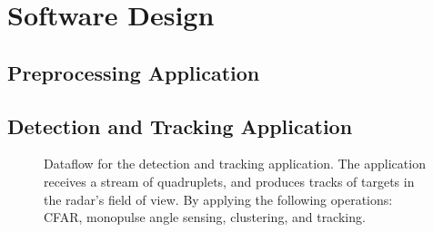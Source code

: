 \section{Software Design}

    
\subsection{Preprocessing Application}



\subsection{Detection and Tracking Application}
\begin{figure}[htbp]
    \centering
    \caption{Dataflow for the detection and tracking application. The application receives a stream of quadruplets, and produces tracks of targets in the radar's field of view. By applying the following operations: CFAR, monopulse angle sensing, clustering, and tracking.}
    \label{fig:detection-and-tracking-dataflow}
\end{figure}